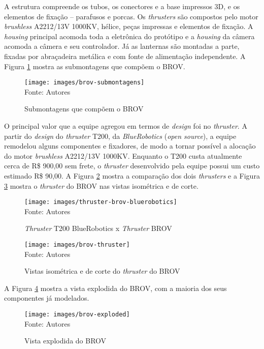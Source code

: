 A estrutura compreende os tubos, os conectores e a base impressos 3D, e os elementos de fixação -- parafusos e porcas. Os \textit{thrusters} são compostos pelo motor \textit{brushless} A2212/13V 1000KV, hélice, peças impressas e elementos de fixação. A \textit{housing} principal acomoda toda a eletrônica do protótipo e a \textit{housing} da câmera acomoda a câmera e seu controlador. Já as lanternas são montadas a parte, fixadas por abraçadeira metálica e com fonte de alimentação independente. A Figura \ref{fig:brov-submontagens} mostra as submontagens que compõem o BROV.

\begin{figure}[h]
	\centering
	\caption[Submontagens que compõem o BROV]{Submontagens que compõem o BROV}
	\label{fig:brov-submontagens}
	\texttt{[image: images/brov-submontagens]}\\
	\footnotesize Fonte: Autores
\end{figure}

O principal valor que a equipe agregou em termos de \textit{design} foi no \textit{thruster}. A partir do \textit{design} do \textit{thruster} T200, da \textit{BlueRobotics} (\textit{open source}), a equipe remodelou alguns componentes e fixadores, de modo a tornar possível a alocação do motor \textit{brushless} A2212/13V 1000KV. Enquanto o T200 custa atualmente cerca de R\$ 900,00 sem frete, o \textit{thruster} desenvolvido pela equipe possui um custo estimado R\$ 90,00. A Figura \ref{fig:thruster-brov-bluerobotics} mostra a comparação dos dois \textit{thrusters} e a Figura \ref{fig:brov-thruster} mostra o \textit{thruster} do BROV nas vistas isométrica e de corte.

\begin{figure}[h]
	\centering
	\caption[\textit{Thruster} T200 BlueRobotics x \textit{Thruster} BROV]{\textit{Thruster} T200 BlueRobotics x \textit{Thruster} BROV}
	\label{fig:thruster-brov-bluerobotics}
	\texttt{[image: images/thruster-brov-bluerobotics]}\\
	\footnotesize Fonte: Autores
\end{figure}

\begin{figure}[h]
	\centering
	\caption[Vistas isométrica e de corte do \textit{thruster} do BROV]{Vistas isométrica e de corte do \textit{thruster} do BROV}
	\label{fig:brov-thruster}
	\texttt{[image: images/brov-thruster]}\\
	\footnotesize Fonte: Autores
\end{figure}

A Figura \ref{fig:brov-exploded} mostra a vista explodida do BROV, com a maioria dos seus componentes já modelados.

\begin{figure}[h]
	\centering
	\caption[Vista explodida do BROV]{Vista explodida do BROV}
	\label{fig:brov-exploded}
	\texttt{[image: images/brov-exploded]}\\
	\footnotesize Fonte: Autores
\end{figure}

